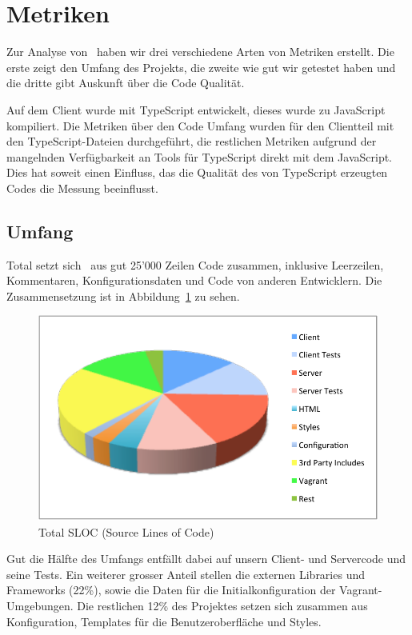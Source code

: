 \section{Metriken}
	Zur Analyse von \eeppi\ haben wir drei verschiedene Arten von Metriken erstellt.
	Die erste zeigt den Umfang des Projekts,
	die zweite wie gut wir getestet haben
	und die dritte gibt Auskunft über die Code Qualität.
	
	Auf dem Client wurde mit TypeScript entwickelt, dieses wurde zu JavaScript kompiliert.
	Die Metriken über den Code Umfang wurden für den Clientteil mit den TypeScript-Dateien durchgeführt,
	die restlichen Metriken aufgrund der mangelnden Verfügbarkeit an Tools für TypeScript direkt mit dem JavaScript.
	Dies hat soweit einen Einfluss, das die Qualität des von TypeScript erzeugten Codes die Messung beeinflusst.
	
	\subsection{Umfang}
	Total setzt sich \eeppi\ aus gut 25'000 Zeilen Code zusammen, inklusive Leerzeilen, Kommentaren, Konfigurationsdaten und Code von anderen Entwicklern.
	Die Zusammensetzung ist in Abbildung\ \ref{fig:TotalSLOC} zu sehen.
	\begin{figure}[H]
		\includegraphics[width=\largeThird\textwidth]{projectPlan/media/img/totalSLOC.pdf}
		\centering
		\caption{Total SLOC (Source Lines of Code)}
		\label{fig:TotalSLOC}
	\end{figure}
	
	Gut die Hälfte des Umfangs entfällt dabei auf unsern Client- und Servercode und seine Tests.
	Ein weiterer grosser Anteil stellen die externen Libraries und Frameworks (22\%),
	sowie die Daten für die Initialkonfiguration der Vagrant-Umgebungen.
	Die restlichen 12\% des Projektes setzen sich zusammen aus Konfiguration, Templates für die Benutzeroberfläche und Styles.
	
